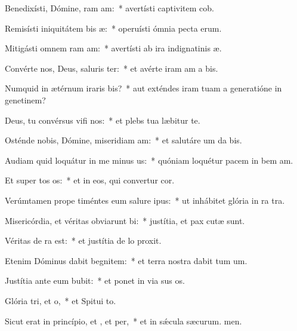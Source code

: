 \item Benedixísti, Dómine, ram am:~* avertísti captivitem cob.
\item Remisísti iniquitátem bis æ:~* operuísti ómnia pecta erum.
\item Mitigásti omnem ram am:~* avertísti ab ira indignatinis æ.
\item Convérte nos, Deus, saluris ter:~* et avérte iram am a bis.
\item Numquid in ætérnum iraris bis?~* aut exténdes iram tuam a generatióne in genetinem?
\item Deus, tu convérsus vifi nos:~* et plebs tua læbitur  te.
\item Osténde nobis, Dómine, miseridiam am:~* et salutáre um da bis.
\item Audiam quid loquátur in me minus us:~* quóniam loquétur pacem in bem am.
\item Et super tos os:~* et in eos, qui convertur  cor.
\item Verúmtamen prope timéntes eum salure ipus:~* ut inhábitet glória in ra tra.
\item Misericórdia, et véritas obviarunt bi:~* justítia, et pax cutæ sunt.
\item Véritas de ra  est:~* et justítia de lo proxit.
\item Etenim Dóminus dabit begnitem:~* et terra nostra dabit tum um.
\item Justítia ante eum bubit:~* et ponet in via sus os.
\item Glória tri, et o,~* et Spitui to.
\item Sicut erat in princípio, et , et per,~* et in sǽcula sæcurum. men.
